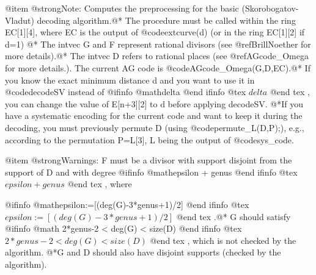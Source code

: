 @item @strong{Note:}
Computes the preprocessing for the basic (Skorobogatov-Vladut)
decoding algorithm.@*
The procedure must be called within the ring EC[1][4], where EC is
the output of @code{extcurve(d)} (or in the ring EC[1][2] if d=1) @*
The intvec G and F represent rational divisors (see
@ref{BrillNoether} for more details).@*
The intvec D refers to rational places (see @ref{AGcode_Omega}
for more details.).
The current AG code is @code{AGcode_Omega(G,D,EC)}.@*
If you know the exact minimum distance d and you want to use it in
@code{decodeSV} instead of 
@ifinfo
@math{delta}
@end ifinfo
@tex
$delta$
@end tex
, you can change the value
of E[n+3][2] to d before applying decodeSV.
@*If you have a systematic encoding for the current code and want to
keep it during the decoding, you must previously permute D (using
@code{permute_L(D,P);}), e.g., according to the permutation
P=L[3], L being the output of @code{sys_code}.

@item @strong{Warnings:}
F must be a divisor with support disjoint from the support of D and
with degree 
@ifinfo
@math{epsilon + genus}
@end ifinfo
@tex
$epsilon + genus$
@end tex
, where

@ifinfo
@math{epsilon:=[(deg(G)-3*genus+1)/2]}
@end ifinfo
@tex
$epsilon:=[(deg(G)-3*genus+1)/2]$
@end tex
.@*
G should satisfy 
@ifinfo
@math{ 2*genus-2 < deg(G) < size(D) }
@end ifinfo
@tex
$ 2*genus-2 < deg(G) < size(D) $
@end tex
, which is
not checked by the algorithm.
@*G and D should also have disjoint supports (checked by the
algorithm).

